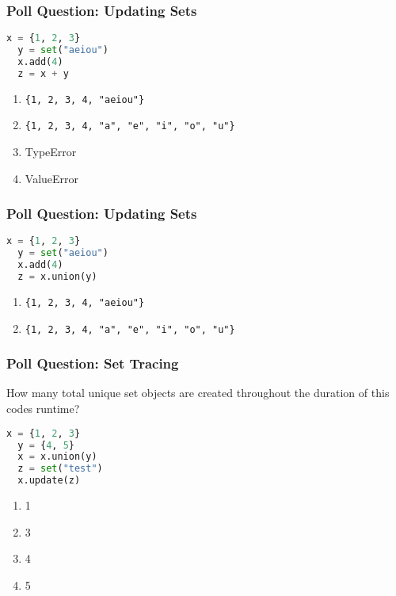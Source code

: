 \documentclass[xcolor=table]{beamer}
\begin{document}
%
%
\begin{frame}[fragile]
  \frametitle{Poll Question: Updating Sets}
  \begin{lstlisting}[language=Python, autogobble]
  x = {1, 2, 3}
  y = set("aeiou")
  x.add(4)
  z = x + y
  \end{lstlisting}
  \vfill
  \begin{enumerate}[A] 
    \item \lstinline|{1, 2, 3, 4, "aeiou"}|
    \item \lstinline|{1, 2, 3, 4, "a", "e", "i", "o", "u"}|
    \item TypeError
    \item ValueError
  \end{enumerate}
\end{frame}

%
%
\begin{frame}[fragile]
  \frametitle{Poll Question: Updating Sets}
  \begin{lstlisting}[language=Python, autogobble]
  x = {1, 2, 3}
  y = set("aeiou")
  x.add(4)
  z = x.union(y)
  \end{lstlisting}
  \vfill
  \begin{enumerate}[A] 
    \item \lstinline|{1, 2, 3, 4, "aeiou"}|
    \item \lstinline|{1, 2, 3, 4, "a", "e", "i", "o", "u"}|
  \end{enumerate}
\end{frame}

%
%
\begin{frame}[fragile]
  \frametitle{Poll Question: Set Tracing}
  How many total unique set objects are created throughout the duration of this
  codes runtime?
  \begin{lstlisting}[language=Python, autogobble]
  x = {1, 2, 3}
  y = {4, 5}
  x = x.union(y)
  z = set("test")
  x.update(z)
  \end{lstlisting}
  \vfill
  \begin{enumerate}[A] 
    \item 1
    \item 3
    \item 4
    \item 5
  \end{enumerate}
\end{frame}
\end{document}
